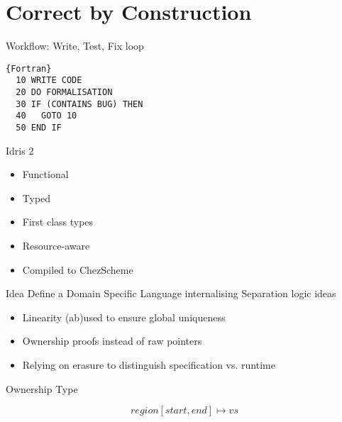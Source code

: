 \section{Correct by Construction}

\begin{frame}[fragile]{Workflow: Write, Test, Fix loop}

\begin{lstlisting}{Fortran}
  10 WRITE CODE
  20 DO FORMALISATION
  30 IF (CONTAINS BUG) THEN
  40   GOTO 10
  50 END IF
\end{lstlisting}

\end{frame}

\begin{frame}{Idris 2}
  \begin{itemize}
    \item Functional
    \item Typed
    \item First class types
    \item Resource-aware
    \item Compiled to ChezScheme
  \end{itemize}
\end{frame}


\begin{frame}{Idea}
  Define a Domain Specific Language internalising
  Separation logic ideas

  \begin{itemize}
    \item Linearity (ab)used to ensure global uniqueness
    \item Ownership proofs instead of raw pointers
    \item Relying on erasure to distinguish specification vs. runtime
  \end{itemize}

\end{frame}

\begin{frame}{Ownership Type}


  $$\mathit{region}[\mathit{start}, \mathit{end}] \mapsto \mathit{vs}$$


\end{frame}

\newcommand{\listappend}{\mathop{+\!\!\!+}}

